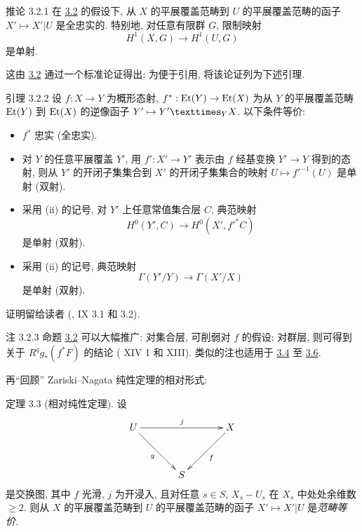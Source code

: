 \begin{enonce*}{推论 3.2.1}
在 \hyperref[XVI.prop3.2]{3.2} 的假设下, 从 $X$ 的平展覆盖范畴到 $U$ 的平展覆盖范畴的函子 $X'\mapsto X'|U$ 是全忠实的. 特别地, 对任意有限群 $G$, 限制映射
$$
H^{1}(X,G)\longrightarrow H^{1}(U,G)
$$
是单射.
\end{enonce*}

这\pageoriginale 由 \hyperref[XVI.prop3.2]{3.2} 通过一个标准论证得出; 为便于引用, 将该论证列为下述引理.

\begin{enonce*}{引理 3.2.2}
设 $f:X\rightarrow Y$ 为概形态射, $f^{\ast}:\operatorname{Et}(Y)\rightarrow \operatorname{Et}(X)$ 为从 $Y$ 的平展覆盖范畴 $\operatorname{Et}(Y)$ 到 $\operatorname{Et}(X)$ 的逆像函子 $Y'\mapsto \fprod{Y'}{X}{Y}$. 以下条件等价:
\begin{itemize}
\item[(i)] $f^{\ast}$ 忠实 (\resp 全忠实).

\item[(ii)] 对 $Y$ 的任意平展覆盖 $Y'$, 用 $f':X'\rightarrow Y'$ 表示由 $f$ 经基变换 $Y'\rightarrow Y$ 得到的态射, 则从 $Y'$ 的开闭子集集合到 $X'$ 的开闭子集集合的映射 $U\mapsto {f'}^{-1}(U)$ 是单射 (\resp 双射).

\item[(ii bis)] 采用 {\rm(ii)} 的记号, 对 $Y'$ 上任意常值集合层 $C$, 典范映射
$$
H^{0}(Y',C)\longrightarrow H^{0}(X',{f'}^{\ast}C)
$$
是单射 (\resp 双射).

\item[(iii)] 采用 {\rm(ii)} 的记号, 典范映射
$$
\Gamma(Y'/Y)\longrightarrow \Gamma(X'/X)
$$
是单射 (\resp 双射).
\end{itemize}
\end{enonce*}

证明留给读者 (\cf {}, IX 3.1 和 3.2).

\begin{enonce*}[remark]{注 3.2.3}
命题 \hyperref[XVI.prop3.2]{3.2} 可以大幅推广\pageoriginale: 对集合层, 可削弱对 $f$ 的假设; 对群层, 则可得到关于 $R^{q}g_{\ast}(f^{\ast}F)$ 的结论 (\cf {} XIV 1 和  XIII). 类似的注也适用于 \hyperref[XVI.cor3.4]{3.4} 至 \hyperref[XVI.cor3.6]{3.6}.
\end{enonce*}

再“回顾” Zariski--Nagata 纯性定理的相对形式:

\begin{enonce*}{定理 3.3}
(相对纯性定理). 设
$$
\xymatrix@=1.25cm{
U \ar[rr]^{j} \ar[rd]_{g}&     &X\ar[ld]^{f}\\
  & S   &
}
$$
是交换图, 其中 $f$ 光滑, $j$ 为开浸入, 且对任意 $s\in S$, $X_s-U_s$ 在 $X_s$ 中处处余维数 $\geq 2$. 则从 $X$ 的平展覆盖范畴到 $U$ 的平展覆盖范畴的函子 $X'\mapsto X'|U$ 是\emph{范畴等价.}
\end{enonce*}


